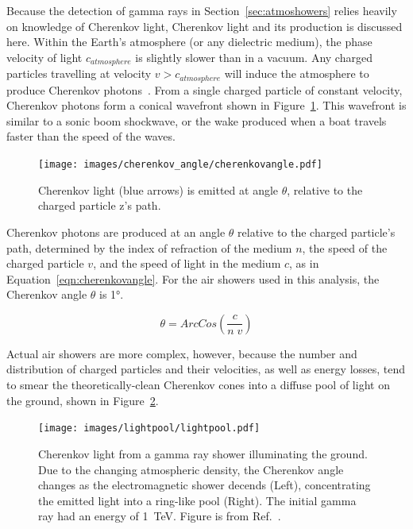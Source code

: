   Because the detection of gamma rays in Section~\ref{sec:atmoshowers} relies heavily on knowledge of Cherenkov light, Cherenkov light and its production is discussed here.
  Within the Earth's atmosphere (or any dielectric medium), the phase velocity of light $c_{atmosphere}$ is slightly slower than in a vacuum.
  Any charged particles travelling at velocity $v > c_{atmosphere}$ will induce the atmosphere to produce Cherenkov photons~\cite{cherenkov}.
  From a single charged particle of constant velocity, Cherenkov photons form a conical wavefront shown in Figure~\ref{fig:cherenkovangle}.
  This wavefront is similar to a sonic boom shockwave, or the wake produced when a boat travels faster than the speed of the waves.

  \begin{figure}[ht]
    \centering
    \texttt{[image: images/cherenkov\_angle/cherenkovangle.pdf]}
    \caption[Chernekov Emission Angle]{
      Cherenkov light (blue arrows) is emitted at angle $\theta$, relative to the charged particle z's path.
    }
    \label{fig:cherenkovangle}
  \end{figure}

  Cherenkov photons are produced at an angle $\theta$ relative to the charged particle's path, determined by the index of refraction of the medium $n$, the speed of the charged particle $v$, and the speed of light in the medium $c$, as in Equation~\ref{eqn:cherenkovangle}.
  For the air showers used in this analysis, the Cherenkov angle $\theta$ is \nicetilde\ang{1}.

  \begin{equation}\label{eqn:cherenkovangle}
    \theta = ArcCos \left ( \frac{c}{n \; v} \right )
  \end{equation}
  
  Actual air showers are more complex, however, because the number and distribution of charged particles and their velocities, as well as energy losses, tend to smear the theoretically-clean Cherenkov cones into a diffuse pool of light on the ground, shown in Figure~\ref{fig:lightpool}.

  \begin{figure}[ht]
    \centering
    \texttt{[image: images/lightpool/lightpool.pdf]}
    \caption[Chernekov Light Pool]{
      Cherenkov light from a gamma ray shower illuminating the ground.
      Due to the changing atmospheric density, the Cherenkov angle changes as the electromagnetic shower decends (Left), concentrating the emitted light into a ring-like pool (Right).
      The initial gamma ray had an energy of \SI{1}{\TeV}.
      Figure is from Ref.~\cite{Voelk}.
    }
    \label{fig:lightpool}
  \end{figure}
  
